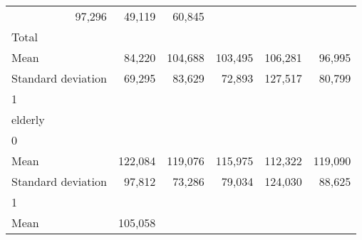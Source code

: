 \begin{tabular}{llllll}
  \multicolumn{1}{r}{97,296} &
  \multicolumn{1}{r}{49,119} &
  \multicolumn{1}{r}{60,845} \\
\multicolumn{1}{l}{\hspace{3em}Total} &
  \multicolumn{1}{|r}{} &
  \multicolumn{1}{r}{} &
  \multicolumn{1}{r}{} &
  \multicolumn{1}{r}{} &
  \multicolumn{1}{r}{} \\
\multicolumn{1}{l}{\hspace{4em}Mean} &
  \multicolumn{1}{|r}{84,220} &
  \multicolumn{1}{r}{104,688} &
  \multicolumn{1}{r}{103,495} &
  \multicolumn{1}{r}{106,281} &
  \multicolumn{1}{r}{96,995} \\
\multicolumn{1}{l}{\hspace{4em}Standard deviation} &
  \multicolumn{1}{|r}{69,295} &
  \multicolumn{1}{r}{83,629} &
  \multicolumn{1}{r}{72,893} &
  \multicolumn{1}{r}{127,517} &
  \multicolumn{1}{r}{80,799} \\
\multicolumn{1}{l}{\hspace{1em}1} &
  \multicolumn{1}{|r}{} &
  \multicolumn{1}{r}{} &
  \multicolumn{1}{r}{} &
  \multicolumn{1}{r}{} &
  \multicolumn{1}{r}{} \\
\multicolumn{1}{l}{\hspace{2em}elderly} &
  \multicolumn{1}{|r}{} &
  \multicolumn{1}{r}{} &
  \multicolumn{1}{r}{} &
  \multicolumn{1}{r}{} &
  \multicolumn{1}{r}{} \\
\multicolumn{1}{l}{\hspace{3em}0} &
  \multicolumn{1}{|r}{} &
  \multicolumn{1}{r}{} &
  \multicolumn{1}{r}{} &
  \multicolumn{1}{r}{} &
  \multicolumn{1}{r}{} \\
\multicolumn{1}{l}{\hspace{4em}Mean} &
  \multicolumn{1}{|r}{122,084} &
  \multicolumn{1}{r}{119,076} &
  \multicolumn{1}{r}{115,975} &
  \multicolumn{1}{r}{112,322} &
  \multicolumn{1}{r}{119,090} \\
\multicolumn{1}{l}{\hspace{4em}Standard deviation} &
  \multicolumn{1}{|r}{97,812} &
  \multicolumn{1}{r}{73,286} &
  \multicolumn{1}{r}{79,034} &
  \multicolumn{1}{r}{124,030} &
  \multicolumn{1}{r}{88,625} \\
\multicolumn{1}{l}{\hspace{3em}1} &
  \multicolumn{1}{|r}{} &
  \multicolumn{1}{r}{} &
  \multicolumn{1}{r}{} &
  \multicolumn{1}{r}{} &
  \multicolumn{1}{r}{} \\
\multicolumn{1}{l}{\hspace{4em}Mean} &
  \multicolumn{1}{|r}{105,058} &

\end{tabular}
